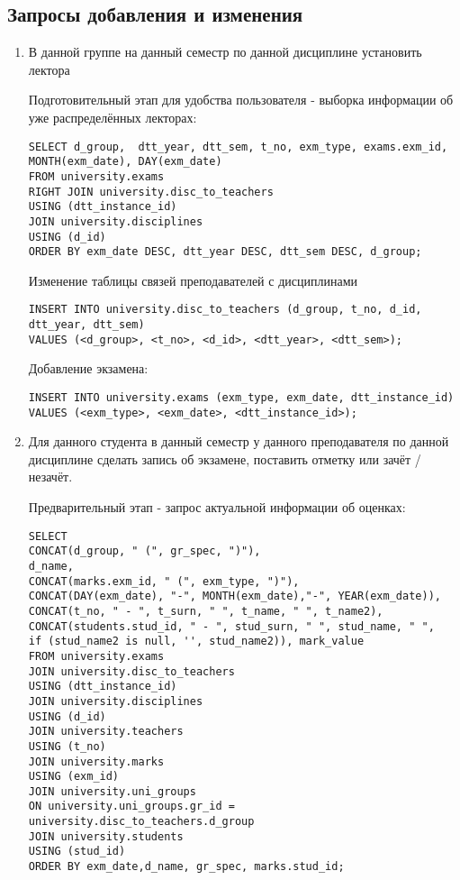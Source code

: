 \documentclass[zuevDbReport.tex]{subfiles}
\begin{document}
\subsection{Запросы добавления и изменения}
\begin{enumerate}

\item{}В данной группе на данный семестр по данной дисциплине установить лектора\par
Подготовительный этап для удобства пользователя - выборка информации об уже распределённых лекторах:
\begin{lstlisting}
SELECT d_group,  dtt_year, dtt_sem, t_no, exm_type, exams.exm_id, MONTH(exm_date), DAY(exm_date)
FROM university.exams
RIGHT JOIN university.disc_to_teachers
USING (dtt_instance_id)
JOIN university.disciplines
USING (d_id)
ORDER BY exm_date DESC, dtt_year DESC, dtt_sem DESC, d_group;
\end{lstlisting}

Изменение таблицы связей преподавателей с дисциплинами
\begin{lstlisting}
INSERT INTO university.disc_to_teachers (d_group, t_no, d_id, dtt_year, dtt_sem)
VALUES (<d_group>, <t_no>, <d_id>, <dtt_year>, <dtt_sem>);
\end{lstlisting}

Добавление экзамена:
\begin{lstlisting}
INSERT INTO university.exams (exm_type, exm_date, dtt_instance_id)
VALUES (<exm_type>, <exm_date>, <dtt_instance_id>);
\end{lstlisting}

\item{}Для данного студента в данный семестр у данного преподавателя по данной дисциплине сделать запись об экзамене, поставить отметку или зачёт / незачёт. \par
Предварительный этап - запрос актуальной информации об оценках:
\begin{lstlisting}
SELECT
CONCAT(d_group, " (", gr_spec, ")"),
d_name,
CONCAT(marks.exm_id, " (", exm_type, ")"),
CONCAT(DAY(exm_date), "-", MONTH(exm_date),"-", YEAR(exm_date)),
CONCAT(t_no, " - ", t_surn, " ", t_name, " ", t_name2),
CONCAT(students.stud_id, " - ", stud_surn, " ", stud_name, " ",
if (stud_name2 is null, '', stud_name2)), mark_value
FROM university.exams
JOIN university.disc_to_teachers
USING (dtt_instance_id)
JOIN university.disciplines
USING (d_id)
JOIN university.teachers
USING (t_no)
JOIN university.marks
USING (exm_id)
JOIN university.uni_groups
ON university.uni_groups.gr_id = university.disc_to_teachers.d_group
JOIN university.students
USING (stud_id)
ORDER BY exm_date,d_name, gr_spec, marks.stud_id;
\end{lstlisting}


\end{enumerate}
\end{document}
